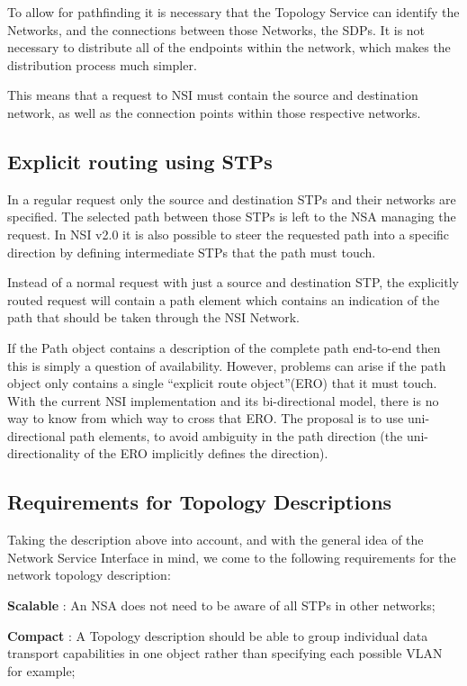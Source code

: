 \documentclass[12pt]{article}  %
\begin{document}
 To allow for pathfinding it is necessary that the Topology Service 
can identify the Networks, and the connections between those Networks, the SDPs. 
It is not necessary to distribute all of the endpoints within the network, which 
makes the distribution process much simpler.

 This means that a request to NSI must contain the source and destination 
network, as well as the connection points within those respective networks.


\subsection{Explicit routing using STPs}

 In a regular request only the source and destination STPs and 
their networks are specified. The selected path between those STPs is left to the 
NSA managing the request. In NSI v2.0 it is also possible to steer the requested 
path into a specific direction by defining intermediate STPs that the path must 
touch.

 Instead of a normal request with just a source and destination 
STP, the explicitly routed request will contain a path element which contains an 
indication of the path that should be taken through the NSI Network.

 If the Path object contains a description of the complete path 
end-to-end then this is simply a question of availability. However, problems can 
arise if the path object only contains a single ``explicit route object''(ERO) 
that it must touch. With the current NSI implementation and its bi-directional 
model, there is no way to know from which way to cross that ERO. The proposal is 
to use uni-directional path elements, to avoid ambiguity in the path direction 
(the uni-directionality of the ERO implicitly defines the direction).\label{h.4s5qtlwb3csi}


\subsection{Requirements for Topology Descriptions}

 Taking the description above into account, and with the general 
idea of the Network Service Interface in mind, we come to the following requirements 
for the network topology description:

 \textbf{Scalable} : An NSA does not need to be 
aware of all STPs in other networks;

 \textbf{Compact} : A Topology description should 
be able to group individual data transport capabilities in one object rather than 
specifying each possible VLAN for example;
\end{document}
